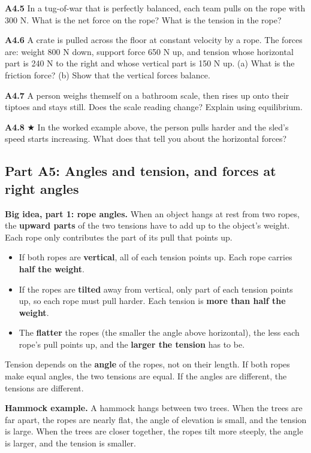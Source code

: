 \documentclass[
]{article}
\providecommand{\tightlist}{%
  \setlength{\itemsep}{0pt}\setlength{\parskip}{0pt}}
\begin{document}
\textbf{A4.5} In a tug-of-war that is perfectly balanced, each team
pulls on the rope with 300 N. What is the net force on the rope? What is
the tension in the rope?

\textbf{A4.6} A crate is pulled across the floor at constant velocity by
a rope. The forces are: weight 800 N down, support force 650 N up, and
tension whose horizontal part is 240 N to the right and whose vertical
part is 150 N up. (a) What is the friction force? (b) Show that the
vertical forces balance.

\textbf{A4.7} A person weighs themself on a bathroom scale, then rises
up onto their tiptoes and stays still. Does the scale reading change?
Explain using equilibrium.

\textbf{A4.8} ★ In the worked example above, the person pulls harder and
the sled's speed starts increasing. What does that tell you about the
horizontal forces?

\subsection{Part A5: Angles and tension, and forces at right
angles}\label{part-a5-angles-and-tension-and-forces-at-right-angles}

\textbf{Big idea, part 1: rope angles.} When an object hangs at rest
from two ropes, the \textbf{upward parts} of the two tensions have to
add up to the object's weight. Each rope only contributes the part of
its pull that points up.

\begin{itemize}
\tightlist
\item
  If both ropes are \textbf{vertical}, all of each tension points up.
  Each rope carries \textbf{half the weight}.
\item
  If the ropes are \textbf{tilted} away from vertical, only part of each
  tension points up, so each rope must pull harder. Each tension is
  \textbf{more than half the weight}.
\item
  The \textbf{flatter} the ropes (the smaller the angle above
  horizontal), the less each rope's pull points up, and the
  \textbf{larger the tension} has to be.
\end{itemize}

Tension depends on the \textbf{angle} of the ropes, not on their length.
If both ropes make equal angles, the two tensions are equal. If the
angles are different, the tensions are different.

\textbf{Hammock example.} A hammock hangs between two trees. When the
trees are far apart, the ropes are nearly flat, the angle of elevation
is small, and the tension is large. When the trees are closer together,
the ropes tilt more steeply, the angle is larger, and the tension is
smaller.
\end{document}

